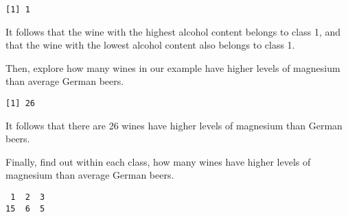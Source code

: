 \documentclass[
  letterpaper,
  DIV=11,
  numbers=noendperiod]{scrartcl}
\newenvironment{Shaded}{\begin{snugshade}}{\end{snugshade}}
\newcommand{\AttributeTok}[1]{\textcolor[rgb]{0.40,0.45,0.13}{#1}}
\newcommand{\CommentTok}[1]{\textcolor[rgb]{0.37,0.37,0.37}{#1}}
\newcommand{\DecValTok}[1]{\textcolor[rgb]{0.68,0.00,0.00}{#1}}
\newcommand{\FunctionTok}[1]{\textcolor[rgb]{0.28,0.35,0.67}{#1}}
\newcommand{\NormalTok}[1]{\textcolor[rgb]{0.00,0.23,0.31}{#1}}
\newcommand{\OtherTok}[1]{\textcolor[rgb]{0.00,0.23,0.31}{#1}}
\newcommand{\SpecialCharTok}[1]{\textcolor[rgb]{0.37,0.37,0.37}{#1}}
\begin{document}
\begin{verbatim}
[1] 1
\end{verbatim}

It follows that the wine with the highest alcohol content belongs to
class 1, and that the wine with the lowest alcohol content also belongs
to class 1.

Then, explore how many wines in our example have higher levels of
magnesium than average German beers.

\begin{Shaded}
\end{Shaded}

\begin{verbatim}
[1] 26
\end{verbatim}

It follows that there are 26 wines have higher levels of magnesium than
German beers.

Finally, find out within each class, how many wines have higher levels
of magnesium than average German beers.

\begin{Shaded}
\end{Shaded}

\begin{verbatim}
 1  2  3 
15  6  5 
\end{verbatim}
\end{document}
